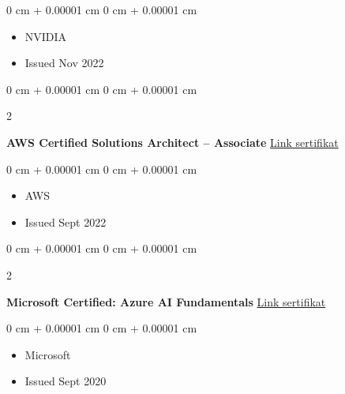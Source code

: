 \documentclass[10pt, letterpaper]{article}
\newenvironment{highlights}{
    \begin{itemize}[
        topsep=0.10 cm,
        parsep=0.10 cm,
        partopsep=0pt,
        itemsep=0pt,
        leftmargin=0 cm + 10pt
    ]
}{
    \end{itemize}
} %
\newenvironment{onecolentry}{
    \begin{adjustwidth}{
        0 cm + 0.00001 cm
    }{
        0 cm + 0.00001 cm
    }
}{
    \end{adjustwidth}
} %
\newenvironment{twocolentry}[2][]{
    \onecolentry
    \def\secondColumn{#2}
    \setcolumnwidth{\fill, 4.5 cm}
    \begin{paracol}{2}
}{
    \switchcolumn \raggedleft \secondColumn
    \end{paracol}
    \endonecolentry
} %
\begin{document}
        \vspace{0.10 cm}
        \begin{onecolentry}
            \begin{highlights}
                \item NVIDIA
                \item Issued Nov 2022
            \end{highlights}
        \end{onecolentry}

        \vspace{0.2 cm}


        \begin{twocolentry}{
            \href{https://www.credly.com/badges/0cf7a632-2800-411a-b78c-e92e5e074bf1/linked_in_profile}{Link sertifikat}
        }
            \textbf{
AWS Certified Solutions Architect – Associate}\end{twocolentry}

        \vspace{0.10 cm}
        \begin{onecolentry}
            \begin{highlights}
                \item AWS
                \item Issued Sept 2022
            \end{highlights}
        \end{onecolentry}

        \vspace{0.2 cm}


        \begin{twocolentry}{
            \href{https://www.credly.com/badges/166a4f25-1e28-4727-884c-5ef9a1982f07?source=linked_in_profile}{Link sertifikat}
        }
            \textbf{Microsoft Certified: Azure AI Fundamentals}\end{twocolentry}

        \vspace{0.10 cm}
        \begin{onecolentry}
            \begin{highlights}
                \item Microsoft
                \item Issued Sept 2020
            \end{highlights}
        \end{onecolentry}

        \vspace{0.2 cm}
\end{document}

